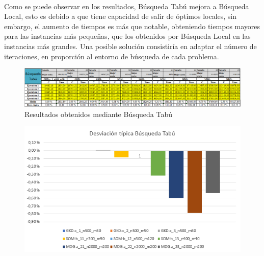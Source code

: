 \documentclass{article}
\begin{document}
	\paragraph{}Como se puede observar en los resultados, Búsqueda Tabú mejora a Búsqueda Local, esto es debido a que tiene capacidad de salir de óptimos locales, sin embargo, el aumento de tiempos es más que notable, obteniendo tiempos mayores para las instancias más pequeñas, que los obtenidos por Búsqueda Local en las instancias más grandes. Una posible solución consistiría en adaptar el número de iteraciones, en proporción al entorno de búsqueda de cada problema.
	
	\begin{figure}[H]
		
		\centering
		\includegraphics[scale=0.4]{img/btabuResult}
		\caption{Resultados obtenidos mediante Búsqueda Tabú}
		
	\end{figure}
	
	\begin{figure}[H]
		
		\centering
		\includegraphics[scale=0.4]{img/DTBtabu}
		
	\end{figure}
	
\end{document}
